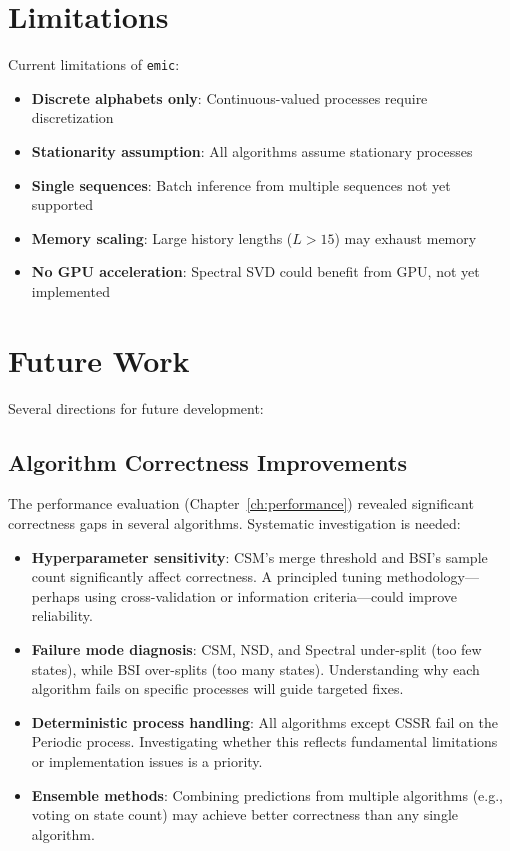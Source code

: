 \documentclass[11pt,a4paper]{report}
\theoremstyle{definition}
\theoremstyle{plain}
\newcommand{\emic}{\texttt{emic}}
\begin{document}
\section{Limitations}

Current limitations of \emic{}:

\begin{itemize}
    \item \textbf{Discrete alphabets only}: Continuous-valued processes require discretization
    \item \textbf{Stationarity assumption}: All algorithms assume stationary processes
    \item \textbf{Single sequences}: Batch inference from multiple sequences not yet supported
    \item \textbf{Memory scaling}: Large history lengths ($L > 15$) may exhaust memory
    \item \textbf{No GPU acceleration}: Spectral SVD could benefit from GPU, not yet implemented
\end{itemize}

\section{Future Work}

Several directions for future development:

\subsection{Algorithm Correctness Improvements}

The performance evaluation (Chapter~\ref{ch:performance}) revealed significant correctness gaps in several algorithms. Systematic investigation is needed:

\begin{itemize}
    \item \textbf{Hyperparameter sensitivity}: CSM's merge threshold and BSI's sample count significantly affect correctness. A principled tuning methodology---perhaps using cross-validation or information criteria---could improve reliability.

    \item \textbf{Failure mode diagnosis}: CSM, NSD, and Spectral under-split (too few states), while BSI over-splits (too many states). Understanding why each algorithm fails on specific processes will guide targeted fixes.

    \item \textbf{Deterministic process handling}: All algorithms except CSSR fail on the Periodic process. Investigating whether this reflects fundamental limitations or implementation issues is a priority.

    \item \textbf{Ensemble methods}: Combining predictions from multiple algorithms (e.g., voting on state count) may achieve better correctness than any single algorithm.
\end{itemize}
\end{document}
